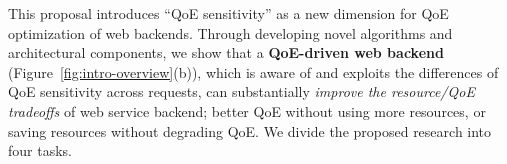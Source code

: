 
This proposal introduces ``QoE sensitivity'' as a new dimension for QoE optimization of web backends. 
Through developing novel algorithms and architectural components, we show that a {\bf QoE-driven web backend} (Figure~\ref{fig:intro-overview}(b)), which is aware of and exploits the differences of QoE sensitivity across requests, can substantially {\em improve the resource/QoE tradeoffs} of web service backend; \ie better QoE without using more resources, or saving resources without degrading QoE. 
We divide the proposed research into four tasks.

